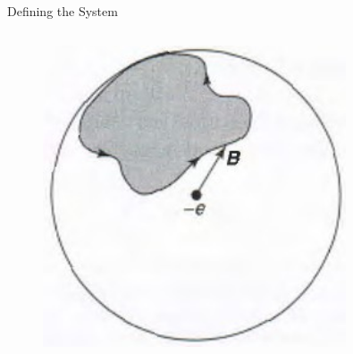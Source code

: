 \documentclass[9pt]{beamer}
\begin{document}
\begin{frame}{Defining the System}
\begin{columns}
    \begin{column}{0.4\textwidth}
      \begin{figure}
        \includegraphics[width=0.8\textwidth]{b_spin_system_2}
      \end{figure}
    \end{column}
    
  \end{columns}

\end{frame}
\end{document}

